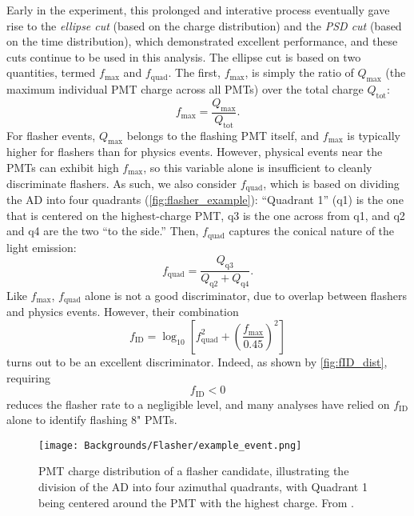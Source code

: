 \documentclass[../thesis.tex]{subfiles}
\begin{document}
\newcommand\fmax{f_{\mathrm{max}}}
\newcommand\fquad{f_{\mathrm{quad}}}
\newcommand\fID{f_{\mathrm{ID}}}
\newcommand\fPSD{f_{\mathrm{PSD}}}

Early in the experiment, this prolonged and interative process eventually gave rise to the \emph{ellipse cut} (based on the charge distribution) and the \emph{PSD cut} (based on the time distribution), which demonstrated excellent performance, and these cuts continue to be used in this analysis. The ellipse cut is based on two quantities, termed $\fmax$ and $\fquad$. The first, $\fmax$, is simply the ratio of $Q_{\mathrm{max}}$ (the maximum individual PMT charge across all PMTs) over the total charge $Q_{\mathrm{tot}}$:
\begin{equation}
  \fmax = \frac{Q_{\mathrm{max}}}{Q_{\mathrm{tot}}}.
\end{equation}
For flasher events, $Q_{\mathrm{max}}$ belongs to the flashing PMT itself, and $\fmax$ is typically higher for flashers than for physics events. However, physical events near the PMTs can exhibit high $\fmax$, so this variable alone is insufficient to cleanly discriminate flashers. As such, we also consider $\fquad$, which is based on dividing the AD into four quadrants (\autoref{fig:flasher_example}): ``Quadrant 1'' (q1) is the one that is centered on the highest-charge PMT, q3 is the one across from q1, and q2 and q4 are the two ``to the side.'' Then, $\fquad$ captures the conical nature of the light emission:
\begin{equation}
  \fquad = \frac{Q_{\mathrm{q3}}}{Q_{\mathrm{q2}} + Q_{\mathrm{q4}}}.
\end{equation}
Like $\fmax$, $\fquad$ alone is not a good discriminator, due to overlap between flashers and physics events. However, their combination
\begin{equation}
  \fID = \log_{10} \left[ \fquad^2 + \left( \frac{\fmax}{0.45} \right)^2 \right]
\end{equation}
turns out to be an excellent discriminator. Indeed, as shown by \autoref{fig:fID_dist}, requiring
\begin{equation}
  \label{eq:ellipseCut}
  \fID < 0
\end{equation}
reduces the flasher rate to a negligible level, and many analyses have relied on $\fID$ alone to identify flashing 8" PMTs.

\begin{figure}[h]
  \texttt{[image: Backgrounds/Flasher/example\_event.png]}
  \caption{PMT charge distribution of a flasher candidate, illustrating the division of the AD into four azimuthal quadrants, with Quadrant 1 being centered around the PMT with the highest charge. From \cite{An_2017}.}
  \label{fig:flasher_example}
\end{figure}
\end{document}
